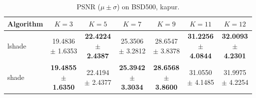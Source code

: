 \begin{table}[htbp]
\centering
\caption{PSNR ($\mu \pm \sigma$) on BSD500, kapur.}
\label{tab:exp1-kapur-psnr}
\begin{tabular}{lcccccc}
\toprule
Algorithm & $K=3$ & $K=5$ & $K=7$ & $K=9$ & $K=11$ & $K=12$ \\
\midrule
lshade & 19.4836 $\pm$ 1.6353 & \textbf{22.4224 $\pm$ 2.4387} & 25.3506 $\pm$ 3.2812 & 28.6547 $\pm$ 3.8378 & \textbf{31.2256 $\pm$ 4.0844} & \textbf{32.0093 $\pm$ 4.2301} \\
shade & \textbf{19.4855 $\pm$ 1.6350} & 22.4194 $\pm$ 2.4377 & \textbf{25.3942 $\pm$ 3.3034} & \textbf{28.6568 $\pm$ 3.8600} & 31.0550 $\pm$ 4.1485 & 31.9975 $\pm$ 4.2254 \\
\bottomrule
\end{tabular}
\end{table}